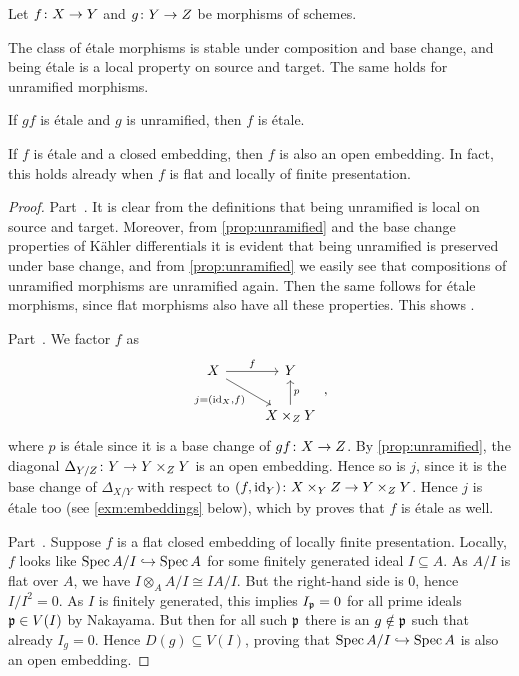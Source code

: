 \documentclass[a4paper, 10pt, oneside, DIV=9, chapterprefix=true, numbers=enddot, bibliography=totoc]{scrbook}
\begin{document}
\begin{fact}\label{fact:etaleProperties}
	Let $f\colon X\morphism Y$ and $g\colon Y\morphism Z$ be morphisms of schemes.
	\begin{alphanumerate}
		\item The class of étale morphisms is stable under composition and base change, and being étale is a local property on source and target. The same holds for unramified morphisms.
		\item If $gf$ is étale and $g$ is unramified, then $f$ is étale.
		\item If $f$ is étale and a closed embedding, then $f$ is also an open embedding. In fact, this holds already when $f$ is flat and locally of finite presentation.
	\end{alphanumerate}
\end{fact}
\begin{proof}
	Part~. It is clear from the definitions that being unramified is local on source and target. Moreover, from \cref{prop:unramified} and the base change properties of Kähler differentials it is evident that being unramified is preserved under base change, and from \cref{prop:unramified} we easily see that compositions of unramified morphisms are unramified again. Then the same follows for étale morphisms, since flat morphisms also have all these properties. This shows .
	
	Part~. We factor $f$ as
	\begin{equation*}
		\begin{tikzcd}
			X\rar["f"]\drar["{j=(\id_X,f)}"{swap}]& Y\\
			& X\times_ZY\uar["p"{swap}]
		\end{tikzcd}\,,
	\end{equation*}
	where $p$ is étale since it is a base change of $gf\colon X\morphism Z$. By \cref{prop:unramified}, the diagonal $\Delta_{Y/Z}\colon Y\morphism Y\times_ZY$ is an open embedding. Hence so is $j$, since it is the base change of $\Delta_{X/Y}$ with respect to $(f,\id_Y)\colon X\times_YZ\morphism Y\times_ZY$. Hence $j$ is étale too (see \cref{exm:embeddings} below), which by  proves that $f$ is étale as well.
	
	Part~. Suppose $f$ is a flat closed embedding of locally finite presentation. Locally, $f$ looks like $\Spec A/I\monomorphism \Spec A$ for some finitely generated ideal $I\subseteq A$. As $A/I$ is flat over $A$, we have $I\otimes_AA/I\cong IA/I$. But the right-hand side is $0$, hence $I/I^2=0$. As $I$ is finitely generated, this implies $I_{\mathfrak{p}}=0$ for all prime ideals $\mathfrak{p}\in V(I)$ by Nakayama. But then for all such $\mathfrak{p}$ there is an $g\notin\mathfrak{p}$ such that already $I_g=0$. Hence $D(g)\subseteq V(I)$, proving that $\Spec A/I\monomorphism\Spec A$ is also an open embedding.
\end{proof}
\end{document}
